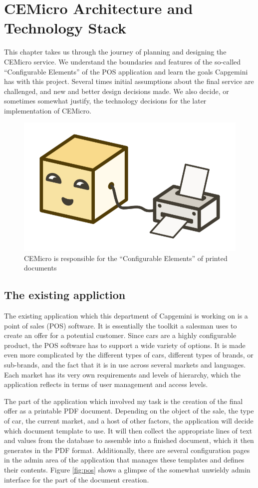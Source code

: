 \chapter{CEMicro Architecture and Technology Stack}
\label{sec:arch}

This chapter takes us through the journey of planning and designing the CEMicro service. We understand the boundaries and features of the so-called ``Configurable Elements'' of the POS application and learn the goals Capgemini has with this project. Several times initial assumptions about the final service are challenged, and new and better design decisions made. We also decide, or sometimes somewhat justify, the technology decisions for the later implementation of CEMicro.

\begin{figure}[ht]
  \centering
  \includegraphics[width=0.4\linewidth]{assets/illustration-microservice-printer.png}
  \caption{CEMicro is responsible for the ``Configurable Elements'' of printed documents}
\end{figure}

\section{The existing appliction}

The existing application which this department of Capgemini is working on is a point of sales (POS) software. It is essentially the toolkit a salesman uses to create an offer for a potential customer. Since cars are a highly configurable product, the POS software has to support a wide variety of options. It is made even more complicated by the different types of cars, different types of brands, or sub-brands, and the fact that it is in use across several markets and languages. Each market has its very own requirements and levels of hierarchy, which the application reflects in terms of user management and access levels.

The part of the application which involved my task is the creation of the final offer as a printable PDF document. Depending on the object of the sale, the type of car, the current market, and a host of other factors, the application will decide which document template to use. It will then collect the appropriate lines of text and values from the database to assemble into a finished document, which it then generates in the PDF format. Additionally, there are several configuration pages in the admin area of the application that manages these templates and defines their contents. Figure \ref{fig:pos} shows a glimpse of the somewhat unwieldy admin interface for the part of the document creation.

